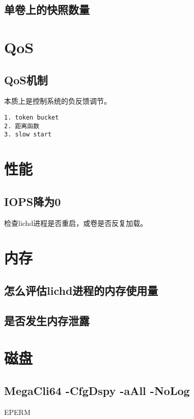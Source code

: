 \subsection{单卷上的快照数量}

\section{QoS}

\subsection{QoS机制}

本质上是控制系统的负反馈调节。

\begin{lstlisting}
1. token bucket
2. 距离函数
3. slow start
\end{lstlisting}

\section{性能}

\subsection{IOPS降为0}

检查lichd进程是否重启，或卷是否反复加载。

\section{内存}

\subsection{怎么评估lichd进程的内存使用量}

\subsection{是否发生内存泄露}

\section{磁盘}

\subsection{MegaCli64 -CfgDspy -aAll -NoLog}

EPERM
